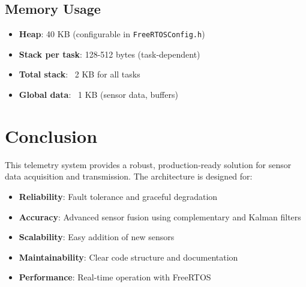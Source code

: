 \documentclass[11pt,a4paper]{article}
\begin{document}
\subsection{Memory Usage}
\begin{itemize}
    \item \textbf{Heap}: 40 KB (configurable in \texttt{FreeRTOSConfig.h})
    \item \textbf{Stack per task}: 128-512 bytes (task-dependent)
    \item \textbf{Total stack}: ~2 KB for all tasks
    \item \textbf{Global data}: ~1 KB (sensor data, buffers)
\end{itemize}

\section{Conclusion}

This telemetry system provides a robust, production-ready solution for sensor data acquisition and transmission. The architecture is designed for:
\begin{itemize}
    \item \textbf{Reliability}: Fault tolerance and graceful degradation
    \item \textbf{Accuracy}: Advanced sensor fusion using complementary and Kalman filters
    \item \textbf{Scalability}: Easy addition of new sensors
    \item \textbf{Maintainability}: Clear code structure and documentation
    \item \textbf{Performance}: Real-time operation with FreeRTOS
\end{itemize}
\end{document}
